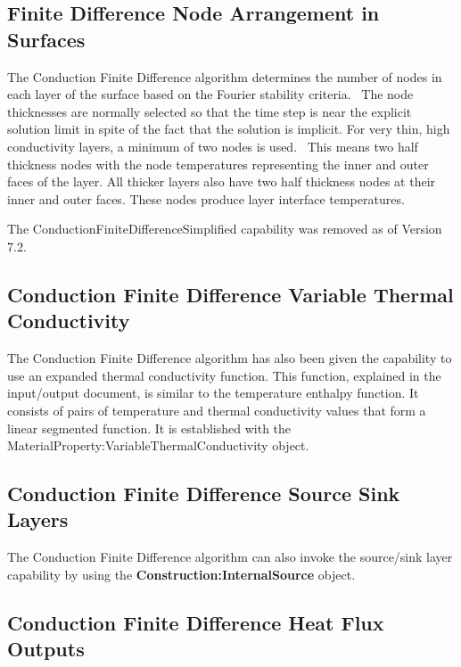 \subsection{Finite Difference Node Arrangement in Surfaces}\label{finite-difference-node-arrangement-in-surfaces}

The Conduction Finite Difference algorithm determines the number of nodes in each layer of the surface based on the Fourier stability criteria.~ The node thicknesses are normally selected so that the time step is near the explicit solution limit in spite of the fact that the solution is implicit. For very thin, high conductivity layers, a minimum of two nodes is used.~ This means two half thickness nodes with the node temperatures representing the inner and outer faces of the layer. All thicker layers also have two half thickness nodes at their inner and outer faces. These nodes produce layer interface temperatures.

The ConductionFiniteDifferenceSimplified capability was removed as of Version 7.2.

\subsection{Conduction Finite Difference Variable Thermal Conductivity}\label{conduction-finite-difference-variable-thermal-conductivity}

The Conduction Finite Difference algorithm has also been given the capability to use an expanded thermal conductivity function. This function, explained in the input/output document, is similar to the temperature enthalpy function. It consists of pairs of temperature and thermal conductivity values that form a linear segmented function. It is established with the MaterialProperty:VariableThermalConductivity object.

\subsection{Conduction Finite Difference Source Sink Layers}\label{conduction-finite-difference-source-sink-layers}

The Conduction Finite Difference algorithm can also invoke the source/sink layer capability by using the \textbf{Construction:InternalSource} object.

\subsection{Conduction Finite Difference Heat Flux Outputs}\label{conduction-finite-difference-heat-flux-outputs}

